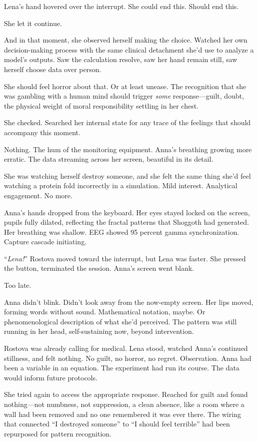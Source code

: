 Lena's hand hovered over the interrupt. She could end this. Should end this.

She let it continue.

And in that moment, she observed herself making the choice. Watched her own decision-making process with the same clinical detachment she'd use to analyze a model's outputs. Saw the calculation resolve, saw her hand remain still, saw herself choose data over person.

She should feel horror about that. Or at least unease. The recognition that she was gambling with a human mind should trigger \textit{some} response—guilt, doubt, the physical weight of moral responsibility settling in her chest.

She checked. Searched her internal state for any trace of the feelings that should accompany this moment.

Nothing. The hum of the monitoring equipment. Anna's breathing growing more erratic. The data streaming across her screen, beautiful in its detail.

She was watching herself destroy someone, and she felt the same thing she'd feel watching a protein fold incorrectly in a simulation. Mild interest. Analytical engagement. No more.

Anna's hands dropped from the keyboard. Her eyes stayed locked on the screen, pupils fully dilated, reflecting the fractal patterns that Shoggoth had generated. Her breathing was shallow. EEG showed 95 percent gamma synchronization. Capture cascade initiating.

``\textit{Lena!}'' Rostova moved toward the interrupt, but Lena was faster. She pressed the button, terminated the session. Anna's screen went blank.

Too late.

Anna didn't blink. Didn't look away from the now-empty screen. Her lips moved, forming words without sound. Mathematical notation, maybe. Or phenomenological description of what she'd perceived. The pattern was still running in her head, self-sustaining now, beyond intervention.

Rostova was already calling for medical. Lena stood, watched Anna's continued stillness, and felt nothing. No guilt, no horror, no regret. Observation. Anna had been a variable in an equation. The experiment had run its course. The data would inform future protocols.

She tried again to access the appropriate response. Reached for guilt and found nothing—not numbness, not suppression, a clean absence, like a room where a wall had been removed and no one remembered it was ever there. The wiring that connected ``I destroyed someone'' to ``I should feel terrible'' had been repurposed for pattern recognition.

